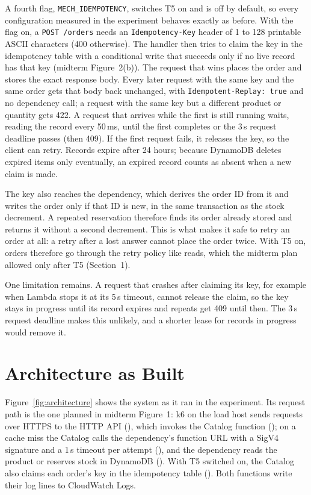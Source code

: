 \documentclass[10pt]{article}
\begin{document}
A fourth flag, \texttt{MECH\_IDEMPOTENCY}, switches T5 on and is off by
default, so every configuration measured in the experiment behaves exactly as
before. With the flag on, a \texttt{POST /orders} needs an
\texttt{Idempotency-Key} header of 1 to 128 printable ASCII characters (400
otherwise). The handler then tries to claim the key in the idempotency table
with a conditional write that succeeds only if no live record has that key
(midterm Figure~2(b)). The request that wins places the order and stores the
exact response body. Every later request with the same key and the same order
gets that body back unchanged, with \texttt{Idempotent-Replay: true} and no
dependency call; a request with the same key but a different product or
quantity gets 422. A request that arrives while the first is still running
waits, reading the record every 50\,ms, until the first completes or the 3\,s
request deadline passes (then 409). If the first request fails, it releases
the key, so the client can retry. Records expire after 24 hours; because
DynamoDB deletes expired items only eventually, an expired record counts as
absent when a new claim is made.

The key also reaches the dependency, which derives the order ID from it and
writes the order only if that ID is new, in the same transaction as the stock
decrement. A repeated reservation therefore finds its order already stored and
returns it without a second decrement. This is what makes it safe to retry an
order at all: a retry after a lost answer cannot place the order twice. With
T5 on, orders therefore go through the retry policy like reads, which the
midterm plan allowed only after T5 (Section~1).

One limitation remains. A request that crashes after claiming its key, for
example when Lambda stops it at its 5\,s timeout, cannot release the claim, so
the key stays in progress until its record expires and repeats get 409 until
then. The 3\,s request deadline makes this unlikely, and a shorter lease for
records in progress would remove it.

\section{Architecture as Built}\label{sec:architecture}
Figure~\ref{fig:architecture} shows the system as it ran in the experiment.
Its request path is the one planned in midterm Figure~1: k6 on the load host
sends requests over HTTPS to the HTTP API (), which invokes the
Catalog function (); on a cache miss the Catalog calls the
dependency's function URL with a SigV4 signature and a 1\,s timeout per
attempt (), and the dependency reads the product or reserves stock in
DynamoDB (). With T5 switched on, the Catalog also claims each
order's key in the idempotency table (). Both functions write their
log lines to CloudWatch Logs.
\end{document}
